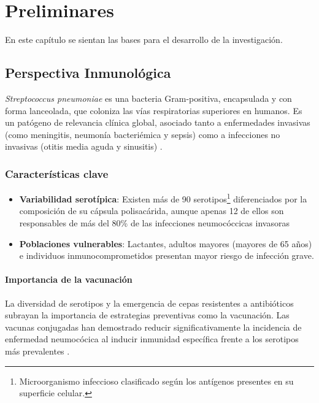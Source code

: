 \chapter{Preliminares}\label{chapter:preliminares}

En este capítulo se sientan las bases para el desarrollo de la investigación.

\section{Perspectiva Inmunológica}

\textit{Streptococcus pneumoniae} es una bacteria Gram-positiva, encapsulada y con forma lanceolada, que coloniza las vías respiratorias superiores en humanos. Es un patógeno de relevancia clínica global, asociado tanto a enfermedades invasivas (como meningitis, neumonía bacteriémica y sepsis) como a infecciones no invasivas (otitis media aguda y sinusitis) \cite{WHO2019}.



\subsection{Características clave}
\begin{itemize}
    \item \textbf{Variabilidad serotípica}: Existen más de 90 serotipos\footnote{Microorganismo infeccioso clasificado según los antígenos presentes en su superficie celular.} diferenciados por la composición de su cápsula polisacárida, aunque apenas 12 de ellos son responsables de más del 80\% de las infecciones neumocóccicas invasoras \cite{PREADOJ2001}
    \item \textbf{Poblaciones vulnerables}: Lactantes, adultos mayores (mayores de 65 años) e individuos inmunocomprometidos presentan mayor riesgo de infección grave.
\end{itemize}

\subsubsection{Importancia de la vacunación}
La diversidad de serotipos y la emergencia de cepas resistentes a antibióticos subrayan la importancia de estrategias preventivas como la vacunación. Las vacunas conjugadas han demostrado reducir significativamente la incidencia de enfermedad neumocócica al inducir inmunidad específica frente a los serotipos más prevalentes \cite{Snedecor2020a}.

